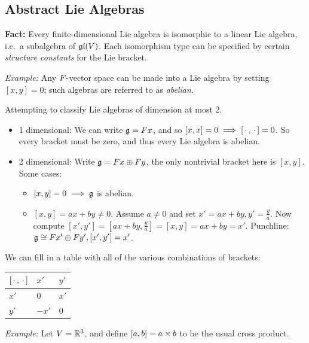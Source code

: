 \hypertarget{abstract-lie-algebras}{%
\subsection{Abstract Lie Algebras}\label{abstract-lie-algebras}}

\textbf{Fact:} Every finite-dimensional Lie algebra is isomorphic to a
linear Lie algebra, i.e.~a subalgebra of \({\mathfrak{gl}}(V)\). Each isomorphism
type can be specified by certain \emph{structure constants} for the Lie
bracket.

\emph{Example:} Any \(F{\hbox{-}}\)vector space can be made into a Lie
algebra by setting \([x,y] = 0\); such algebras are referred to as
\emph{abelian}.

Attempting to classify Lie algebras of dimension at most 2.

\begin{itemize}
\tightlist
\item
  1 dimensional: We can write \({\mathfrak{g}} = Fx\), and so
  \([x, x] = 0 \implies [{\,\cdot\,}, {\,\cdot\,}] = 0\). So every bracket must be
  zero, and thus every Lie algebra is abelian.
\item
  2 dimensional: Write \({\mathfrak{g}} = Fx \oplus Fy\), the only nontrivial
  bracket here is \([x, y]\). Some cases:

  \begin{itemize}
  \tightlist
  \item
    \([x, y] = 0 \implies {\mathfrak{g}}\) is abelian.
  \item
    \([x, y] = ax + by \neq 0\). Assume \(a\neq 0\) and set
    \(x' = ax+by, y' = \frac y a\). Now compute
    \([x', y'] = [ax+by, \frac y a] = [x,y] = ax+by = x'\). Punchline:
    \({\mathfrak{g}} \cong Fx' \oplus Fy', [x', y'] = x'\).
  \end{itemize}
\end{itemize}

We can fill in a table with all of the various combinations of brackets:

\begin{center}
\begin{tabular}{l|ll}
$[{\,\cdot\,}, {\,\cdot\,}]$ & $x'$  & $y'$ \\ \hline
$x'$                                               & $0$   & $x'$ \\
$y'$                                               & $-x'$ & $0$
\end{tabular}
\end{center}

\emph{Example:} Let \(V = {\mathbb{R}}^3\), and define \([a,b] = a\times b\) to
be the usual cross product.

